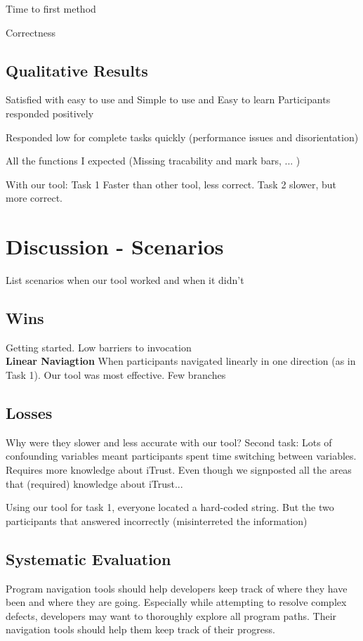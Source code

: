 \documentclass[conference]{IEEEtran}
\begin{document}
Time to first method

Correctness

\subsection{Qualitative Results} 
Satisfied with easy to use	and Simple to use and Easy to learn Participants responded positively

Responded low for complete tasks quickly (performance issues and disorientation)

All the functions I expected (Missing tracability and mark bars, ... )

With our tool: Task 1 Faster than other tool, less correct. Task 2 slower, but more correct. 


\section{Discussion - Scenarios}
List scenarios when our tool worked and when it didn't
\subsection{Wins}
Getting started. Low barriers to invocation
\\
\textbf{Linear Naviagtion}
When participants navigated linearly in one direction (as in Task 1). Our tool was most effective. 
Few branches



\subsection{Losses}
Why were they slower and less accurate with our tool?
Second task: 
Lots of confounding variables meant participants spent time switching between variables.
Requires more knowledge about iTrust. Even though we signposted all the areas that (required) knowledge about iTrust...

Using our tool for task 1, everyone located a hard-coded string. But the two participants that answered incorrectly (misinterreted the information)

\subsection{Systematic Evaluation}
Program navigation tools should help developers keep track of where they have been and where they are going. Especially while attempting to resolve complex defects, developers may want to thoroughly explore all program paths. Their navigation tools should help them keep track of their progress.
\end{document}
